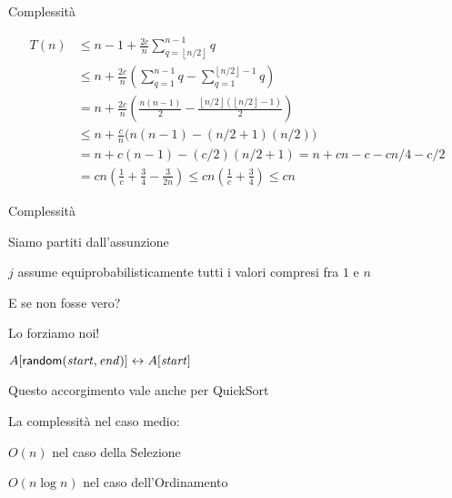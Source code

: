 \begin{frame}{Complessità}

\vspace{-9pt}
\begin{align*}
T\left(n\right) &\le n - 1 + \frac{2c}{n} \sum_{q=\left\lfloor n/2\right\rfloor}^{n-1}q \\
&\le n + \frac{2c}{n}\left(\sum_{q=1}^{n-1}q - \sum_{q=1}^{\left\lfloor n/2\right\rfloor-1}q\right)\\
&= n + \frac{2c}{n}\left(\frac{n\left(n- 1\right)}{2} - \frac{\left\lfloor n/2\right\rfloor\left(\left\lfloor n/2\right\rfloor - 1\right)}{2}\right)\\
&\le n + \frac{c}{n}\big(n\left(n- 1\right) - \left(n/2+1\right)\left(n/2\right)\big)\\
&= n + c\left(n - 1\right) - \left(c/2\right)\left(n/2+ 1\right) = n + cn - c - cn/4 - c/2\\
&= cn \left( \frac{1}{c}+ \frac{3}{4} - \frac{3}{2n}\right) \leq cn \left( \frac{1}{c}+ \frac{3}{4}\right) \leq cn
\end{align*}


\end{frame}

\begin{frame}{Complessità}
   
\vspace{-9pt}
\BIL
\item  Siamo partiti dall’assunzione 
  \BI
  \item $j$ assume equiprobabilisticamente tutti i valori compresi fra $1$ e $n$
  \EI
\item E se non fosse vero?
\item Lo forziamo noi!
  \BI
  \item  $A[\textsf{random}(\mathit{start}, \mathit{end})] \leftrightarrow A[\mathit{start}]$
  \EI
\item Questo accorgimento vale anche per QuickSort    
\item La complessità nel caso medio:
  \BI
  \item $O(n)$ nel caso della Selezione
  \item $O(n \log n)$ nel caso dell'Ordinamento
  \EI
\EIL

\end{frame}

\section{}

